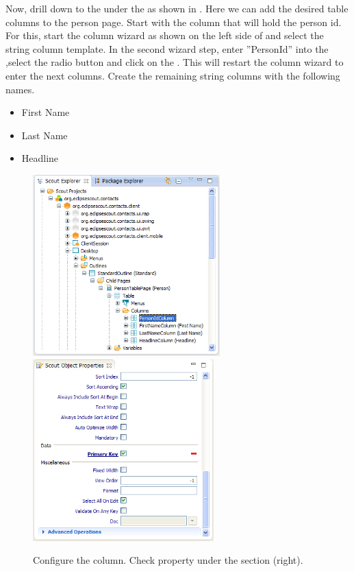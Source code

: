 \documentclass[a4paper,10pt,twoside]{book}
\begin{document}
Now, drill down to the  under the  as shown in . 
Here we can add the desired table columns to the person page. 
Start with the column that will hold the person id. 
For this, start the column wizard as shown on the left side of  and select the string column template. 
In the second wizard step, enter ''PersonId'' into the ,select the radio button  and click on the . 
This will restart the column wizard to enter the next columns. 
Create the remaining string columns with the following names.

\begin{itemize}
  \item{First Name}
  \item{Last Name}
  \item{Headline}
\end{itemize}

\begin{figure}
\includegraphics[height=7cm]{person_id_column.png} \hspace{5mm}
\includegraphics[height=7cm]{person_id_property.png}
\caption{Configure the  column. Check property  under the section  (right).}
\end{figure}
\end{document}
